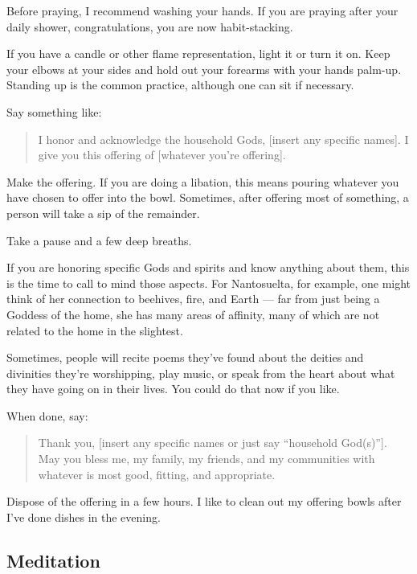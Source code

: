 \documentclass[
]{book}
\begin{document}
Before praying, I recommend washing your hands. If you are praying after your daily shower, congratulations, you are now habit-stacking.

If you have a candle or other flame representation, light it or turn it on. Keep your elbows at your sides and hold out your forearms with your hands palm-up. Standing up is the common practice, although one can sit if necessary.

Say something like:

\begin{quote}
I honor and acknowledge the household Gods, {[}insert any specific names{]}. I give you this offering of {[}whatever you're offering{]}.
\end{quote}

Make the offering. If you are doing a libation, this means pouring whatever you have chosen to offer into the bowl. Sometimes, after offering most of something, a person will take a sip of the remainder.

Take a pause and a few deep breaths.

If you are honoring specific Gods and spirits and know anything about them, this is the time to call to mind those aspects. For Nantosuelta, for example, one might think of her connection to beehives, fire, and Earth --- far from just being a Goddess of the home, she has many areas of affinity, many of which are not related to the home in the slightest.

Sometimes, people will recite poems they've found about the deities and divinities they're worshipping, play music, or speak from the heart about what they have going on in their lives. You could do that now if you like.

When done, say:

\begin{quote}
Thank you, {[}insert any specific names or just say ``household God(s)''{]}. May you bless me, my family, my friends, and my communities with whatever is most good, fitting, and appropriate.
\end{quote}

Dispose of the offering in a few hours. I like to clean out my offering bowls after I've done dishes in the evening.

\hypertarget{meditation}{%
\subsection{Meditation}\label{meditation}}
\end{document}
